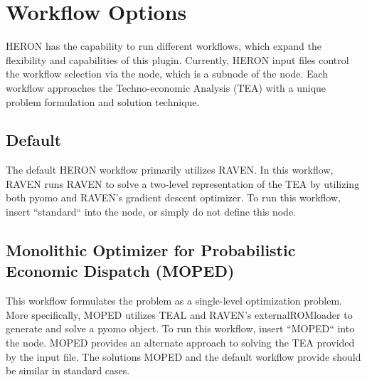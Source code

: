 \section{Workflow Options}
HERON has the capability to run different workflows, which expand the flexibility and capabilities of this plugin. Currently, HERON input files control the workflow selection via the  node, which is a subnode of the  node. Each workflow approaches the Techno-economic Analysis (TEA) with a unique problem formulation and solution technique.

\subsection{Default}
The default HERON workflow primarily utilizes RAVEN. In this workflow, RAVEN runs RAVEN to solve a two-level representation of the TEA by utilizing both pyomo and RAVEN's gradient descent optimizer. To run this workflow, insert ``standard`` into the  node, or simply do not define this node.

\subsection{Monolithic Optimizer for Probabilistic Economic Dispatch (MOPED)}
This workflow formulates the problem as a single-level optimization problem. More specifically, MOPED utilizes TEAL and RAVEN's externalROMloader to generate and solve a pyomo object. To run this workflow, insert ``MOPED`` into the  node.
\noindent MOPED provides an alternate approach to solving the TEA provided by the input file. The solutions MOPED and the default workflow provide should be similar in standard cases.

